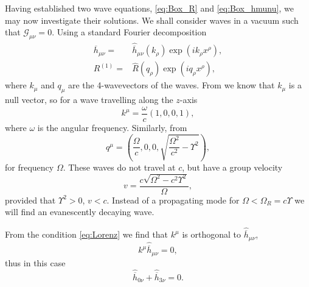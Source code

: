Having established two wave equations, \eqref{eq:Box_R} and \eqref{eq:Box_hmunu}, we may now investigate their solutions. We shall consider waves in a vacuum such that $\mathcal{G}_{\mu\nu} = 0$. Using a standard Fourier decomposition
\begin{align}
\overline{h}_{\mu\nu} = {} & \widehat{\overline{h}}_{\mu\nu}(k_\rho) \exp\left(ik_\rho x^\rho\right),\\
R^{(1)} = {} & \widehat{R}(q_\rho) \exp\left(iq_\rho x^\rho\right),
\end{align}
where $k_\mu$ and $q_\mu$ are the 4-wavevectors of the waves. From  we know that $k_\mu$ is a null vector, so for a wave travelling along the $z$-axis
\begin{equation}
k^\mu = \frac{\omega}{c}(1, 0, 0, 1),
\end{equation}
where $\omega$ is the angular frequency. Similarly, from 
\begin{equation}
q^\mu = \left(\frac{\Omega}{c}, 0, 0, \sqrt{\frac{\Omega^2}{c^2} - \Upsilon^2}\right),
\label{eq:Ricci_q}
\end{equation}
for frequency $\Omega$. These waves do not travel at $c$, but have a group velocity
\begin{equation}
v = \frac{c\sqrt{\Omega^2 - c^2\Upsilon^2}}{\Omega},
\end{equation}
provided that $\Upsilon^2 > 0$, $v < c$. Instead of a propagating mode for $\Omega < \Omega_R = c\Upsilon$ we will find an evanescently decaying wave.

From the condition \eqref{eq:Lorenz} we find that $k^\mu$ is orthogonal to $\widehat{\overline{h}}_{\mu\nu}$,
\begin{equation}
k^\mu\widehat{\overline{h}}_{\mu\nu} = 0,
\end{equation}
thus in this case
\begin{equation}
\widehat{\overline{h}}_{0\nu} + \widehat{\overline{h}}_{3\nu} = 0.
\label{eq:Transverse}
\end{equation}

